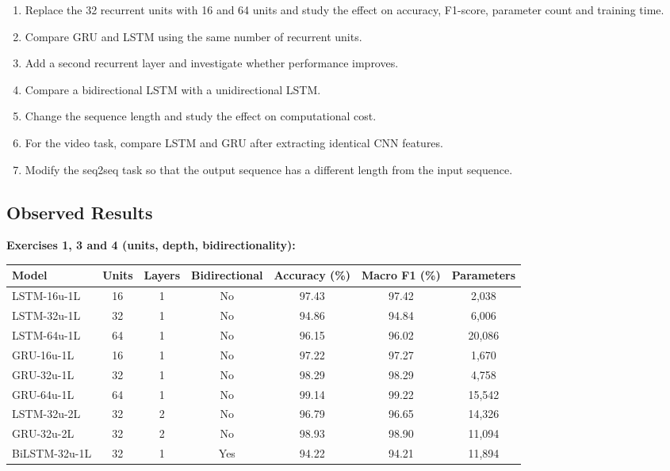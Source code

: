\documentclass[10pt]{article}
\begin{document}
\begin{enumerate}
\item Replace the 32 recurrent units with 16 and 64 units and study the effect
on accuracy, F1-score, parameter count and training time.
\item Compare GRU and LSTM using the same number of recurrent units.
\item Add a second recurrent layer and investigate whether performance improves.
\item Compare a bidirectional LSTM with a unidirectional LSTM.
\item Change the sequence length and study the effect on computational cost.
\item For the video task, compare LSTM and GRU after extracting identical CNN
features.
\item Modify the seq2seq task so that the output sequence has a different
length from the input sequence.
\end{enumerate}

\subsection*{Observed Results}

\textbf{Exercises 1, 3 and 4 (units, depth, bidirectionality):}

\begin{center}
\begin{tabular}{|l|c|c|c|c|c|c|}
\hline
Model & Units & Layers & Bidirectional & Accuracy (\%) & Macro F1 (\%) & Parameters\\
\hline
LSTM-16u-1L & 16 & 1 & No & 97.43 & 97.42 & 2,038\\
LSTM-32u-1L & 32 & 1 & No & 94.86 & 94.84 & 6,006\\
LSTM-64u-1L & 64 & 1 & No & 96.15 & 96.02 & 20,086\\
GRU-16u-1L & 16 & 1 & No & 97.22 & 97.27 & 1,670\\
GRU-32u-1L & 32 & 1 & No & 98.29 & 98.29 & 4,758\\
GRU-64u-1L & 64 & 1 & No & 99.14 & 99.22 & 15,542\\
LSTM-32u-2L & 32 & 2 & No & 96.79 & 96.65 & 14,326\\
GRU-32u-2L & 32 & 2 & No & 98.93 & 98.90 & 11,094\\
BiLSTM-32u-1L & 32 & 1 & Yes & 94.22 & 94.21 & 11,894\\
\hline
\end{tabular}
\end{center}
\end{document}
